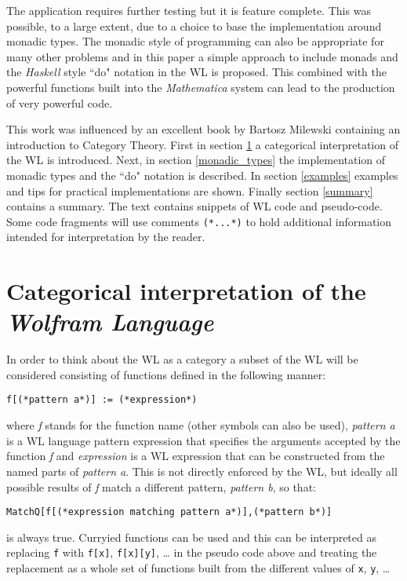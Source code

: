 \documentclass[smallextended]{svjour3}
\begin{document}
The application requires further testing but it is feature complete. 
This was possible, to a large extent, due to a choice to base
the implementation around monadic types. 
The monadic style of programming can also be appropriate for many other problems and
in this paper a simple approach to include monads and the \emph{Haskell} style ``do" notation 
in the WL is proposed. 
This combined with the 
powerful functions built into the \emph{Mathematica} \cite{mathematica}
\cite{mathematica} system
can lead to the production of very powerful code.

This work was influenced by 
an excellent book by Bartosz Milewski \cite{bmilew} containing
an introduction to Category Theory. First in section \ref{categorical_interpretation}
a categorical interpretation of the WL is introduced. Next, in section
\ref{monadic_types}
the implementation of monadic types and the ``do" notation is described. In section
\ref{examples}
examples and tips for practical implementations are shown. Finally
section \ref{summary} contains a summary.
The text contains snippets of WL code and pseudo-code. Some code fragments will use
comments \verb|(*...*)| to hold additional information intended for interpretation by the reader.

\section{Categorical interpretation of the \emph{Wolfram Language}}
\label{categorical_interpretation}

In order to think about the WL as a category a subset of the WL will be considered consisting
of functions defined in the following manner:
\begin{lstlisting}
f[(*pattern a*)] := (*expression*)
\end{lstlisting}
where \emph{f} stands for the function name (other symbols can also be used), \emph{pattern a} is a WL language pattern expression that specifies the
arguments accepted by the function \emph{f} and \emph{expression} is a WL
expression that can be constructed from the named parts of \emph{pattern a}.
This is not directly enforced by the WL, but ideally all possible results 
of \emph{f} match a different pattern, \emph{pattern b}, so that:
\begin{lstlisting}
MatchQ[f[(*expression matching pattern a*)],(*pattern b*)]
\end{lstlisting}
is always true. Curryied functions can be used and this can be
interpreted as replacing \verb|f| with \verb|f[x]|, \verb|f[x][y]|, \ldots
in the pseudo code above and treating the replacement as a whole set of
functions built from the different values of \verb|x|, \verb|y|, \ldots
\end{document}
